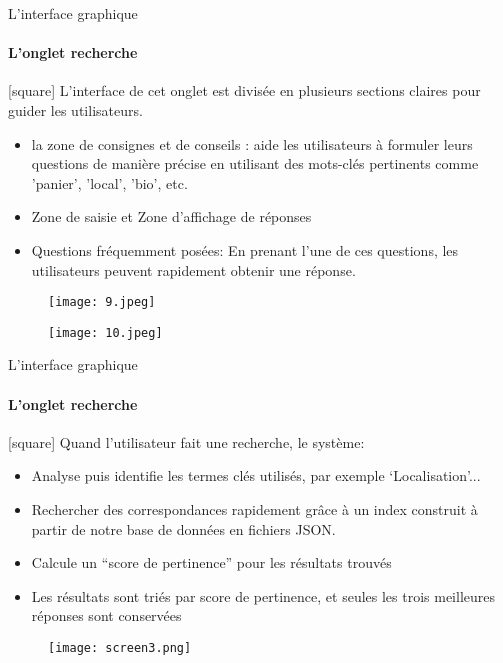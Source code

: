 \documentclass{beamer}
\begin{document}
\begin{frame}{L'interface graphique}
\framesubtitle{L'onglet recherche}
[square]
L’interface de cet onglet est divisée en plusieurs sections claires pour guider les utilisateurs.

\begin{itemize}
    \item la zone de consignes et de conseils : aide les utilisateurs à formuler leurs questions de manière précise en utilisant des mots-clés pertinents comme 'panier', 'local', 'bio', etc.
    \item Zone de saisie et Zone d'affichage de réponses
    \item Questions fréquemment posées: En prenant l'une de ces questions, les utilisateurs peuvent rapidement obtenir une réponse.
\end{itemize}

\begin{figure}[ht]
    \centering
    \begin{minipage}{0.28\linewidth}
        \centering
        \texttt{[image: 9.jpeg]}
        \label{fig:image1}
    \end{minipage}
    \hfill
    \begin{minipage}{0.60\linewidth}
        \centering
        \texttt{[image: 10.jpeg]}
        \label{fig:image2}
    \end{minipage}
\end{figure}
    
\end{frame}

\begin{frame}{L'interface graphique}
\framesubtitle{L'onglet recherche}
[square]
Quand l’utilisateur fait une recherche, le système:
\begin{itemize}
    \item Analyse puis identifie les termes clés utilisés, par exemple ‘Localisation’...
    \item Rechercher des correspondances rapidement grâce à un index construit à partir de notre base de données en fichiers JSON.
    \item Calcule un “score de pertinence” pour les résultats trouvés
    \item Les résultats sont triés par score de pertinence, et seules les trois meilleures réponses sont conservées
\end{itemize}


\begin{figure}
    \centering
    \texttt{[image: screen3.png]}
    \label{fig:enter-label}
\end{figure}

\end{frame}
\end{document}
